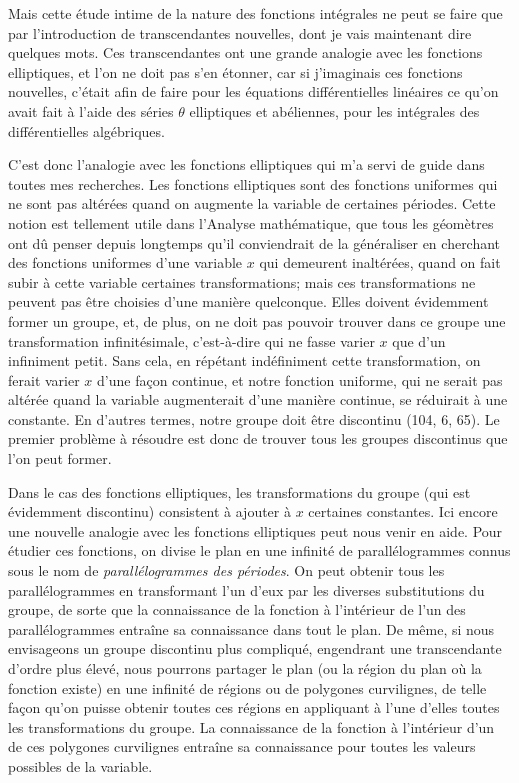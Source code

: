 \documentclass[11pt]{article}
\begin{document}
Mais cette étude intime de la nature des fonctions intégrales ne peut se faire que par l’introduction de transcendantes nouvelles, dont je vais maintenant dire quelques mots. Ces transcendantes ont une grande analogie avec les fonctions elliptiques, et l’on ne doit pas s’en étonner, car si j’imaginais ces fonctions nouvelles, c’était afin de faire pour les équations différentielles linéaires ce qu’on avait fait à l’aide des séries $\theta$ elliptiques et abéliennes, pour les intégrales des différentielles algébriques.

C’est donc l’analogie avec les fonctions elliptiques qui m’a servi de guide dans toutes mes recherches. Les fonctions elliptiques sont des fonctions uniformes qui ne sont pas altérées quand on augmente la variable de certaines périodes. Cette notion est tellement utile dans l’Analyse mathématique, que tous les géomètres ont dû penser depuis longtemps qu’il conviendrait de la généraliser en cherchant des fonctions uniformes d’une variable $x$ qui demeurent inaltérées, quand on fait subir à cette variable certaines transformations; mais ces transformations ne peuvent pas être choisies d’une manière quelconque. Elles doivent évidemment former un groupe, et, de plus, on ne doit pas pouvoir trouver dans ce groupe une transformation infinitésimale, c’est-à-dire qui ne fasse varier $x$ que d’un infiniment petit. Sans cela, en répétant indéfiniment cette transformation, on ferait varier $x$ d’une façon continue, et notre fonction uniforme, qui ne serait pas altérée quand la variable augmenterait d’une manière continue, se réduirait à une constante. En d’autres termes, notre groupe doit être discontinu (104, 6, 65). Le premier problème à résoudre est donc de trouver tous les groupes discontinus que l’on peut former.

Dans le cas des fonctions elliptiques, les transformations du groupe (qui est évidemment discontinu) consistent à ajouter à $x$ certaines constantes. Ici encore une nouvelle analogie avec les fonctions elliptiques peut nous venir en aide. Pour étudier ces fonctions, on divise le plan en une infinité de parallélogrammes connus sous le nom de \emph{parallélogrammes des périodes}. On peut obtenir tous les parallélogrammes en transformant l’un d’eux par les diverses substitutions du groupe, de sorte que la connaissance de la fonction à l’intérieur de l’un des parallélogrammes entraîne sa connaissance dans tout le plan. De même, si nous envisageons un groupe discontinu plus compliqué, engendrant une transcendante d’ordre plus élevé, nous pourrons partager le plan (ou la région du plan où la fonction existe) en une infinité de régions ou de polygones curvilignes, de telle façon qu’on puisse obtenir toutes ces régions en appliquant à l’une d’elles toutes les transformations du groupe. La connaissance de la fonction à l’intérieur d’un de ces polygones curvilignes entraîne sa connaissance pour toutes les valeurs possibles de la variable.
\end{document}
